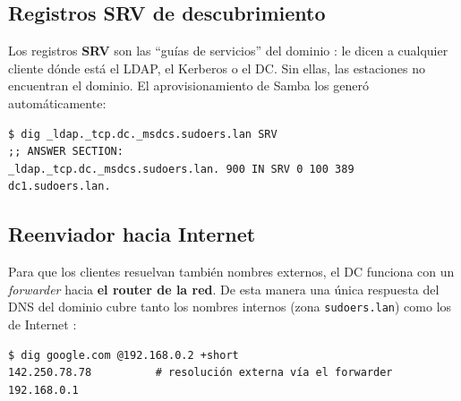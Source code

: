
\subsection{Registros SRV de descubrimiento}

Los registros \textbf{SRV} son las ``gu\'ias de servicios'' del dominio
\citep{rfc2782}: le dicen a cualquier cliente d\'onde est\'a el LDAP, el
Kerberos o el DC. Sin ellas, las estaciones no encuentran el dominio. El
aprovisionamiento de Samba los gener\'o autom\'aticamente:

\begin{lstlisting}[style=terminal]
$ dig _ldap._tcp.dc._msdcs.sudoers.lan SRV
;; ANSWER SECTION:
_ldap._tcp.dc._msdcs.sudoers.lan. 900 IN SRV 0 100 389 dc1.sudoers.lan.
\end{lstlisting}


\subsection{Reenviador hacia Internet}

Para que los clientes resuelvan tambi\'en nombres externos, el DC funciona con
un \textit{forwarder} hacia \textbf{el router de la red}. De esta manera una
\'unica respuesta del DNS del dominio cubre tanto los nombres internos (zona
\texttt{sudoers.lan}) como los de Internet \citep{iscBIND9}:

\begin{lstlisting}[style=terminal]
$ dig google.com @192.168.0.2 +short
142.250.78.78          # resolución externa vía el forwarder 192.168.0.1
\end{lstlisting}


